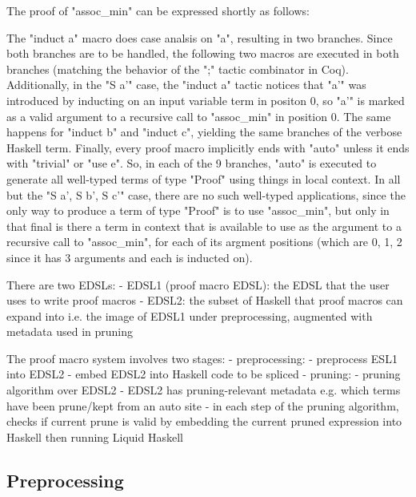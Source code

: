  The proof of "assoc\_min" can be expressed shortly as follows:
  
 The "induct a" macro does case analsis on "a", resulting in two branches. Since both branches are to be handled, the following two macros are executed in both branches (matching the behavior of the ";" tactic combinator in Coq).
 Additionally, in the "S a'" case, the "induct a" tactic notices that "a'" was introduced by inducting on an input variable term in positon 0, so "a'" is marked as a valid argument to a recursive call to "assoc\_min" in position 0.
 The same happens for "induct b" and "induct c", yielding the same branches of the verbose Haskell term.
 Finally, every proof macro implicitly ends with "auto" unless it ends with "trivial" or "use e".
 So, in each of the 9 branches, "auto" is executed to generate all well-typed terms of type "Proof" using things in local context.
 In all but the "S a', S b', S c'" case, there are no such well-typed applications, since the only way to produce a term of type "Proof" is to use "assoc\_min", but only in that final is there a term in context that is available to use as the argument to a recursive call to "assoc\_min", for each of its argment positions (which are 0, 1, 2 since it has 3 arguments and each is inducted on).
  
  
 There are two EDSLs:
 - EDSL1 (proof macro EDSL): the EDSL that the user uses to write proof macros
 - EDSL2: the subset of Haskell that proof macros can expand into i.e. the image of EDSL1 under preprocessing, augmented with metadata used in pruning
  
 The proof macro system involves two stages:
 - preprocessing:
   - preprocess ESL1 into EDSL2
   - embed EDSL2 into Haskell code to be spliced
 - pruning:
   - pruning algorithm over EDSL2 
     - EDSL2 has pruning-relevant metadata e.g. which terms have been prune/kept from an auto site
     - in each step of the pruning algorithm, checks if current prune is valid by embedding the current pruned expression into Haskell then running Liquid Haskell
  
\subsection{Preprocessing}
  
